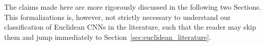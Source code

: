 The claims made here are more rigorously discussed in the following two Sections.
This formalizations is, however, not strictly necessary to understand our classification of Euclidean CNNs in the literature, such that the reader may skip them and jump immediately to Section~\ref{sec:euclidean_literature}.

